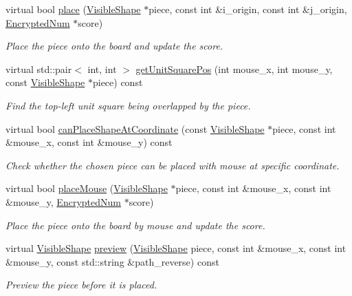 \begin{DoxyCompactItemize}
virtual bool \mbox{\hyperlink{class_board_a55d44066a5889e487e7980d4478dfbb4}{place}} (\mbox{\hyperlink{class_visible_shape}{Visible\+Shape}} $\ast$piece, const int \&i\+\_\+origin, const int \&j\+\_\+origin, \mbox{\hyperlink{class_encrypted_num}{Encrypted\+Num}} $\ast$score)
\begin{DoxyCompactList}\small\item\em Place the piece onto the board and update the score. \end{DoxyCompactList}\item 
virtual std\+::pair$<$ int, int $>$ \mbox{\hyperlink{class_board_a47fb67404ee45b4ad700a57e3849995b}{get\+Unit\+Square\+Pos}} (int mouse\+\_\+x, int mouse\+\_\+y, const \mbox{\hyperlink{class_visible_shape}{Visible\+Shape}} $\ast$piece) const
\begin{DoxyCompactList}\small\item\em Find the top-\/left unit square being overlapped by the piece. \end{DoxyCompactList}\item 
virtual bool \mbox{\hyperlink{class_board_aa4001c8b1e2338fa0dfed7df6f5dcb6b}{can\+Place\+Shape\+At\+Coordinate}} (const \mbox{\hyperlink{class_visible_shape}{Visible\+Shape}} $\ast$piece, const int \&mouse\+\_\+x, const int \&mouse\+\_\+y) const
\begin{DoxyCompactList}\small\item\em Check whether the chosen piece can be placed with mouse at specific coordinate. \end{DoxyCompactList}\item 
virtual bool \mbox{\hyperlink{class_board_a4158b0eca999819bec69fcf9a0bee00c}{place\+Mouse}} (\mbox{\hyperlink{class_visible_shape}{Visible\+Shape}} $\ast$piece, const int \&mouse\+\_\+x, const int \&mouse\+\_\+y, \mbox{\hyperlink{class_encrypted_num}{Encrypted\+Num}} $\ast$score)
\begin{DoxyCompactList}\small\item\em Place the piece onto the board by mouse and update the score. \end{DoxyCompactList}\item 
virtual \mbox{\hyperlink{class_visible_shape}{Visible\+Shape}} \mbox{\hyperlink{class_board_a51f08756175c14dd36acfcdf3b9ea356}{preview}} (\mbox{\hyperlink{class_visible_shape}{Visible\+Shape}} piece, const int \&mouse\+\_\+x, const int \&mouse\+\_\+y, const std\+::string \&path\+\_\+reverse) const
\begin{DoxyCompactList}\small\item\em Preview the piece before it is placed. \end{DoxyCompactList}\item 

\end{DoxyCompactItemize}
